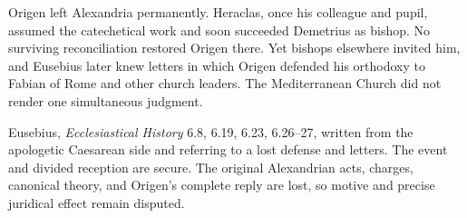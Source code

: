 Origen left Alexandria permanently. Heraclas, once his colleague and pupil,
assumed the catechetical work and soon succeeded Demetrius as bishop. No
surviving reconciliation restored Origen there. Yet bishops elsewhere invited
him, and Eusebius later knew letters in which Origen defended his orthodoxy to
Fabian of Rome and other church leaders. The Mediterranean Church did not
render one simultaneous judgment.

{Eusebius, \emph{Ecclesiastical History} 6.8, 6.19, 6.23, 6.26--27, written
from the apologetic Caesarean side and referring to a lost defense and letters.}
{The event and divided reception are secure. The original Alexandrian acts,
charges, canonical theory, and Origen's complete reply are lost, so motive and
precise juridical effect remain disputed.}
